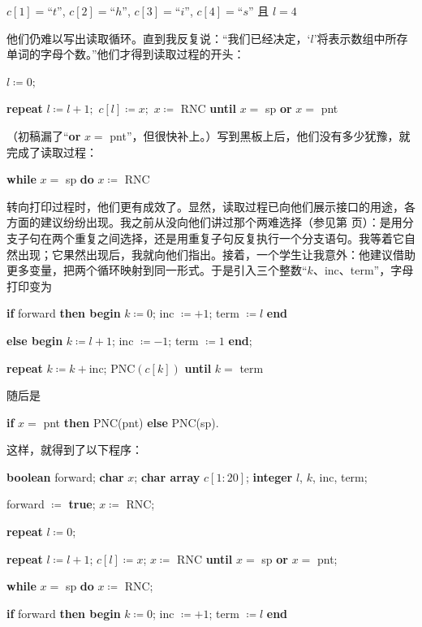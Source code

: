 \documentclass[twoside,11pt,fontset=none]{ctexbook}
\begin{document}
\quad $c[1] = $``$t$'', $c[2] = $``$h$'', $c[3] = $``$i$'', $c[4] = $``$s$'' 且 $l = 4$

他们仍难以写出读取循环。直到我反复说：“我们已经决定，‘$l$’将表示数组中所存单词的字母个数。”他们才得到读取过程的开头：

\quad $l \coloneq 0; $

\quad \textbf{repeat} $l \coloneq l + 1;$ $c[l] \coloneq x;$ $x\coloneq$ RNC \textbf{until} $x =$ sp \textbf{or} $x =$ pnt

\noindent
（初稿漏了“\textbf{or} $x =$ pnt”，但很快补上。）写到黑板上后，他们没有多少犹豫，就完成了读取过程：

\quad \textbf{while} $x =$ sp \textbf{do} $x\coloneq$ RNC

转向打印过程时，他们更有成效了。显然，读取过程已向他们展示接口的用途，各方面的建议纷纷出现。我之前从没向他们讲过那个两难选择（参见第 \pageref{pg:dilema} 页）：是用分支子句在两个重复之间选择，还是用重复子句反复执行一个分支语句。我等着它自然出现；它果然出现后，我就向他们指出。接着，一个学生让我意外：他建议借助更多变量，把两个循环映射到同一形式。于是引入三个整数“$k$、inc、term”，字母打印变为

\quad \textbf{if} forward \textbf{then begin} $k \coloneq 0$; inc $\coloneq + 1$; term $\coloneq l$ \textbf{end}

\tabto{5.8em}\quad \textbf{else begin} $k \coloneq l + 1$; inc $\coloneq - 1$; term $\coloneq 1$ \textbf{end};

\quad \textbf{repeat} $k \coloneq k + \text{inc}$; $\text{PNC}(c[k])$ \textbf{until} $k =$ term

\noindent
随后是

\quad \textbf{if} $x =$ pnt \textbf{then} PNC(pnt) \textbf{else} PNC(sp).

这样，就得到了以下程序：

\quad \textbf{boolean} forward; \textbf{char} $x$; \textbf{char array} $c[1:20]$; \textbf{integer} $l$, $k$, inc, term;

\quad forward $\coloneq$ \textbf{true}; $x \coloneq$ RNC;

\quad \textbf{repeat} $l \coloneq 0$;

\quad \quad \textbf{repeat} $l\coloneq l + 1$; $c[l]\coloneq x$; $x \coloneq$ RNC \textbf{until} $x =$ sp \textbf{or} $x =$ pnt;

\quad \quad \textbf{while} $x =$ sp \textbf{do} $x\coloneq$ RNC;

\quad \quad \textbf{if} forward \textbf{then begin} $k\coloneq 0$; inc $\coloneq + 1$; term $\coloneq l$ \textbf{end}
\end{document}
